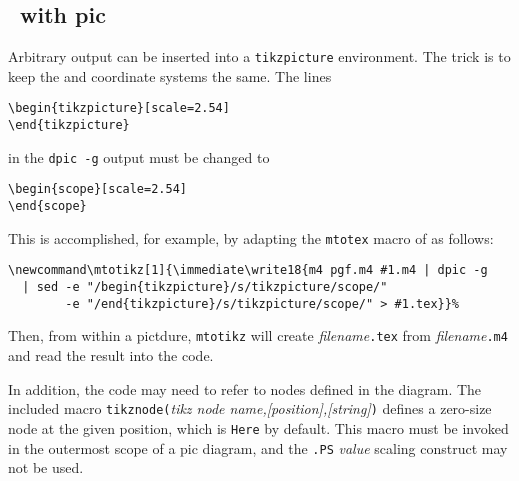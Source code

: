\subsection{\Tikz\ with pic}\label{Tikzwithpic:}
%
%
Arbitrary \pic output can be inserted into a {\tt \bsl{}tikzpicture} 
environment.  The trick is to keep the \pic and \Tikz coordinate systems
the same.
The lines

\vspace{\parsep}
\noindent\verb|\begin{tikzpicture}[scale=2.54]|\\
\noindent\verb|\end{tikzpicture}|
\vspace{\parsep}

\noindent in the {\tt dpic -g} output must be changed to

\vspace{\parsep}
\noindent\verb|\begin{scope}[scale=2.54]|\\
\noindent\verb|\end{scope}|
\vspace{\parsep}

This is accomplished, for example, by adapting the {\tt \bsl{}mtotex}
macro of  as follows:

\vspace{\parsep}
\noindent
\verb^\newcommand\mtotikz[1]{\immediate\write18{m4 pgf.m4 #1.m4 | dpic -g^\\
\verb^  | sed -e "/begin{tikzpicture}/s/tikzpicture/scope/"^\\
\verb^        -e "/end{tikzpicture}/s/tikzpicture/scope/" > #1.tex}}%^\break

Then, from within a \Tikz pictdure, 
{\tt \bsl{}mtotikz\rbr}
will create {\sl filename}{\tt .tex} from {\sl filename}{\tt .m4}
and read the result into the \Tikz code.

In addition, the \Tikz code may need to refer to nodes defined in
the \pic diagram.
The included \Mfour macro
{\tt tikznode(}{\sl tikz node name,[position],[string]}{\tt)}
defines a zero-size \Tikz node at the given \pic position, which is
{\tt Here} by default.
This macro must be
invoked in the outermost scope of a pic diagram, and the
{\tt .PS} {\sl value} scaling construct may not be used. 

